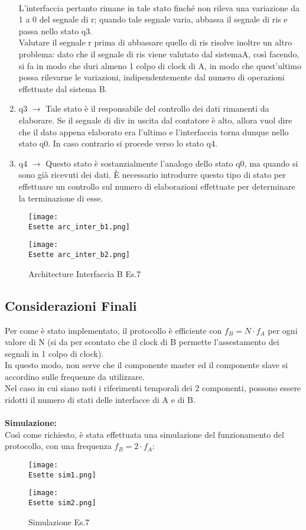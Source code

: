 \documentclass[12pt]{article}
\def \Esette {Allegati/Esercizio7/}
\begin{document}
\begin{enumerate}
          \\L’interfaccia pertanto rimane in tale stato finché non rileva una variazione da 1 a 0 del segnale di r; quando tale segnale varia, abbassa il segnale di ris e passa nello stato q3.
          \\Valutare il segnale r prima di abbassare quello di ris risolve inoltre un altro problema: dato che il segnale di ris viene valutato dal sistemaA, così facendo, si fa in modo che duri almeno 1 colpo di clock di A, in modo che quest’ultimo possa rilevarne le variazioni, indipendentemente dal numero di operazioni effettuate dal sistema B.
    \item q3 $\rightarrow$ Tale stato è il responsabile del controllo dei dati rimanenti da elaborare. Se il segnale di div in uscita dal contatore è alto, allora vuol dire che il dato appena elaborato era l’ultimo e l’interfaccia torna dunque nello stato q0. In caso contrario si procede verso lo stato q4.
    \item q4 $\rightarrow$ Questo stato è sostanzialmente l’analogo dello stato q0, ma quando si sono già ricevuti dei dati.  È necessario introdurre questo tipo di stato per effettuare un controllo sul numero di elaborazioni effettuate per determinare la terminazione di esse.
\end{enumerate}
\clearpage
\begin{figure}[ht!]
    \centering
    \texttt{[image: \\Esette arc\_inter\_b1.png]}
\end{figure}
\begin{figure}[ht!]
    \centering
    \texttt{[image: \\Esette arc\_inter\_b2.png]}
    \caption{Architecture Interfaccia B Es.7}
\end{figure}
\clearpage
\subsection{Considerazioni Finali}
Per come è stato implementato, il protocollo è efficiente con $f_B=N \cdot f_A$ per ogni valore di N (si da per scontato che il clock di B permette l’assestamento dei segnali in 1 colpo di clock).
\\In questo modo, non serve che il componente master ed il componente slave si accordino sulle frequenze da utilizzare.
\\Nel caso in cui siano noti i riferimenti temporali dei 2 componenti, possono essere ridotti il numero di stati delle interfacce di A e di B.
\\\\{\large \textbf{Simulazione:}}
\\Così come richiesto, è stata effettuata una simulazione del funzionamento del protocollo, con una frequenza $f_B=2 \cdot f_A:$
\begin{figure}[ht!]
    \centering
    \texttt{[image: \\Esette sim1.png]}
\end{figure}
\begin{figure}[ht!]
    \centering
    \texttt{[image: \\Esette sim2.png]}
    \caption{Simulazione Es.7}
\end{figure}
\clearpage
\end{document}
